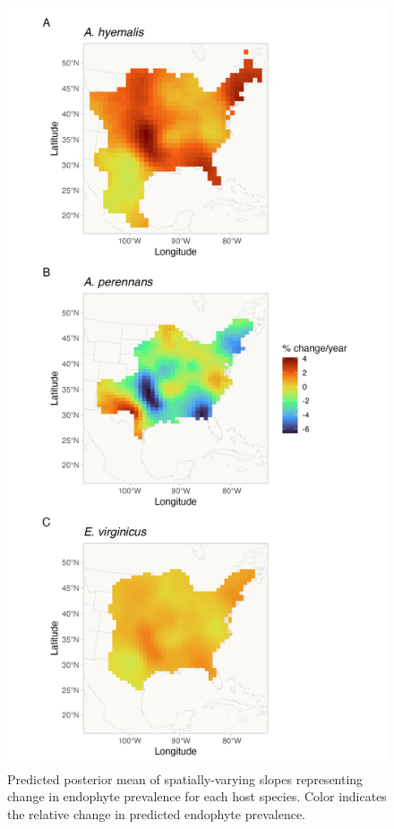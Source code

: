 \documentclass[11pt]{article}
\begin{document}
\begin{figure}[H]
	\label{fig:svc_time_map}
	\centering
	\includegraphics[width = .6\linewidth]{svc_time_map.png}
	\caption[Predicted posterior mean of spatially-varying slopes representing change in endophyte prevalence for each host species.]{Predicted posterior mean of spatially-varying slopes representing change in endophyte prevalence for each host species. Color indicates the relative change in predicted endophyte prevalence.}
\end{figure}
\end{document}
